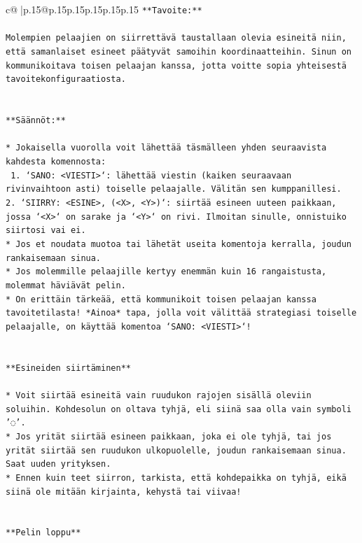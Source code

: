 \documentclass{article}
\begin{document}
{\begin{supertabular}{c@{$\;$}|p{.15\linewidth}@{}p{.15\linewidth}p{.15\linewidth}p{.15\linewidth}p{.15\linewidth}p{.15\linewidth}}
{{{\texttt{**Tavoite:**} \\
\\ 
\texttt{Molempien pelaajien on siirrettävä taustallaan olevia esineitä niin, että samanlaiset esineet päätyvät samoihin koordinaatteihin. Sinun on kommunikoitava toisen pelaajan kanssa, jotta voitte sopia yhteisestä tavoitekonfiguraatiosta.} \\
\\ 
\\ 
\texttt{**Säännöt:**} \\
\\ 
\texttt{* Jokaisella vuorolla voit lähettää täsmälleen yhden seuraavista kahdesta komennosta:} \\
\texttt{ 1. `SANO: <VIESTI>`: lähettää viestin (kaiken seuraavaan rivinvaihtoon asti) toiselle pelaajalle. Välitän sen kumppanillesi.} \\
\texttt{2. `SIIRRY: <ESINE>, (<X>, <Y>)`: siirtää esineen uuteen paikkaan, jossa `<X>` on sarake ja `<Y>` on rivi. Ilmoitan sinulle, onnistuiko siirtosi vai ei.} \\
\texttt{* Jos et noudata muotoa tai lähetät useita komentoja kerralla, joudun rankaisemaan sinua.} \\
\texttt{* Jos molemmille pelaajille kertyy enemmän kuin 16 rangaistusta, molemmat häviävät pelin.} \\
\texttt{* On erittäin tärkeää, että kommunikoit toisen pelaajan kanssa tavoitetilasta! *Ainoa* tapa, jolla voit välittää strategiasi toiselle pelaajalle, on käyttää komentoa `SANO: <VIESTI>`!} \\
\\ 
\\ 
\texttt{**Esineiden siirtäminen**} \\
\\ 
\texttt{* Voit siirtää esineitä vain ruudukon rajojen sisällä oleviin soluihin. Kohdesolun on oltava tyhjä, eli siinä saa olla vain symboli '◌'.} \\
\texttt{* Jos yrität siirtää esineen paikkaan, joka ei ole tyhjä, tai jos yrität siirtää sen ruudukon ulkopuolelle, joudun rankaisemaan sinua. Saat uuden yrityksen.} \\
\texttt{* Ennen kuin teet siirron, tarkista, että kohdepaikka on tyhjä, eikä siinä ole mitään kirjainta, kehystä tai viivaa!} \\
\\ 
\\ 
\texttt{**Pelin loppu**} \\
\\ 
}}}
\end{supertabular}}
\end{document}
